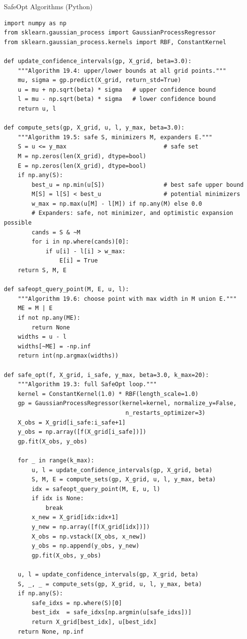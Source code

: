 \documentclass[aspectratio=169,10pt]{beamer}
\begin{document}
\begin{frame}[fragile]{SafeOpt Algorithms (Python)}
\begin{lstlisting}[caption={SafeOpt core routines — Python equivalent of Algorithms 19.3--19.6}]
import numpy as np
from sklearn.gaussian_process import GaussianProcessRegressor
from sklearn.gaussian_process.kernels import RBF, ConstantKernel

def update_confidence_intervals(gp, X_grid, beta=3.0):
    """Algorithm 19.4: upper/lower bounds at all grid points."""
    mu, sigma = gp.predict(X_grid, return_std=True)
    u = mu + np.sqrt(beta) * sigma   # upper confidence bound
    l = mu - np.sqrt(beta) * sigma   # lower confidence bound
    return u, l

def compute_sets(gp, X_grid, u, l, y_max, beta=3.0):
    """Algorithm 19.5: safe S, minimizers M, expanders E."""
    S = u <= y_max                            # safe set
    M = np.zeros(len(X_grid), dtype=bool)
    E = np.zeros(len(X_grid), dtype=bool)
    if np.any(S):
        best_u = np.min(u[S])                 # best safe upper bound
        M[S] = l[S] < best_u                  # potential minimizers
        w_max = np.max(u[M] - l[M]) if np.any(M) else 0.0
        # Expanders: safe, not minimizer, and optimistic expansion possible
        cands = S & ~M
        for i in np.where(cands)[0]:
            if u[i] - l[i] > w_max:
                E[i] = True
    return S, M, E

def safeopt_query_point(M, E, u, l):
    """Algorithm 19.6: choose point with max width in M union E."""
    ME = M | E
    if not np.any(ME):
        return None
    widths = u - l
    widths[~ME] = -np.inf
    return int(np.argmax(widths))

def safe_opt(f, X_grid, i_safe, y_max, beta=3.0, k_max=20):
    """Algorithm 19.3: full SafeOpt loop."""
    kernel = ConstantKernel(1.0) * RBF(length_scale=1.0)
    gp = GaussianProcessRegressor(kernel=kernel, normalize_y=False,
                                   n_restarts_optimizer=3)
    X_obs = X_grid[i_safe:i_safe+1]
    y_obs = np.array([f(X_grid[i_safe])])
    gp.fit(X_obs, y_obs)

    for _ in range(k_max):
        u, l = update_confidence_intervals(gp, X_grid, beta)
        S, M, E = compute_sets(gp, X_grid, u, l, y_max, beta)
        idx = safeopt_query_point(M, E, u, l)
        if idx is None:
            break
        x_new = X_grid[idx:idx+1]
        y_new = np.array([f(X_grid[idx])])
        X_obs = np.vstack([X_obs, x_new])
        y_obs = np.append(y_obs, y_new)
        gp.fit(X_obs, y_obs)

    u, l = update_confidence_intervals(gp, X_grid, beta)
    S, _, _ = compute_sets(gp, X_grid, u, l, y_max, beta)
    if np.any(S):
        safe_idxs = np.where(S)[0]
        best_idx  = safe_idxs[np.argmin(u[safe_idxs])]
        return X_grid[best_idx], u[best_idx]
    return None, np.inf
\end{lstlisting}
\end{frame}
\end{document}
